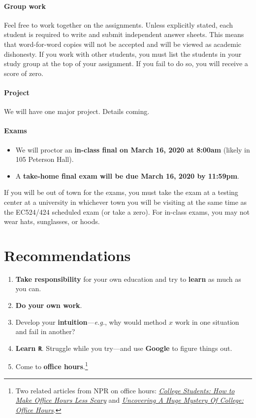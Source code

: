 \documentclass[10pt]{article}
\newcommand{\emf}[1]{\textbf{\textcolor{grass_green}{#1}}}
\begin{document}
\paragraph{Group work} Feel free to work together on the assignments. Unless explicitly stated, each student is required to write and submit independent answer sheets. This means that word-for-word copies will not be accepted and will be viewed as academic dishonesty. If you work with other students, you must list the students in your study group at the top of your assignment. If you fail to do so, you will receive a score of zero.

\paragraph{Project} We will have one major project. Details coming.

\paragraph{Exams}
\begin{itemize}
  \item We will proctor an \emf{in-class final on March 16, 2020 at 8:00am} (likely in 105 Peterson Hall).
  \item A \emf{take-home final exam will be due March 16, 2020 by 11:59pm}.
\end{itemize}
If you will be out of town for the exams, you must take the exam at a testing center at a university in whichever town you will be visiting at the same time as the EC524/424 scheduled exam (or take a zero). For in-class exams, you may not wear hats, sunglasses, or hoods.

\section*{Recommendations}

\begin{enumerate}
  \item \emf{Take responsibility} for your own education and try to \emf{learn} as much as you can.
  \item \emf{Do your own work}.
  \item Develop your \emf{intuition}---\textit{e.g.}, why would method $x$ work in one situation and fail in another?
  \item \emf{Learn \texttt{R}}. Struggle while you try---and use \emf{Google} to figure things out.
  \item Come to \emf{office hours}.\footnote{Two related articles from NPR on office hours: \href{https://www.npr.org/2019/10/05/678815966/college-students-how-to-make-office-hours-less-scary}{\textit{College Students: How to Make Office Hours Less Scary}} and \href{https://www.npr.org/2019/10/02/766568824/uncovering-a-huge-mystery-of-college-office-hours}{\textit{Uncovering A Huge Mystery Of College: Office Hours}}.}
\end{enumerate}
\end{document}
